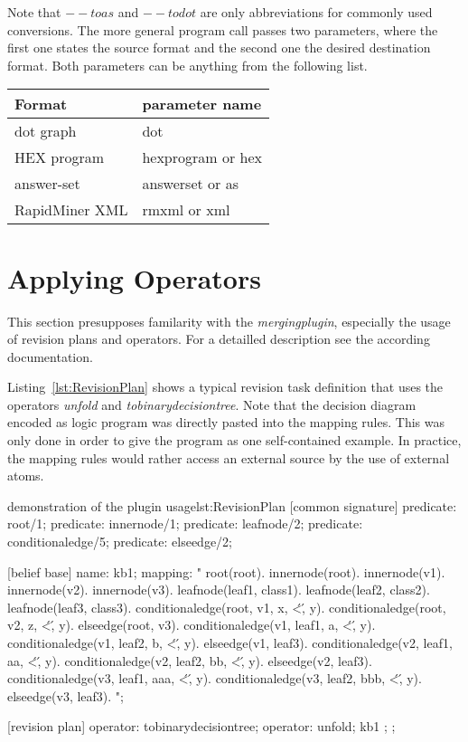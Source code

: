 \documentclass[a4paper,11pt]{article}
\theoremstyle{definition}
\newcommand{\hex}{\textsf{HEX}\xspace }
\newcommand{\dotff}{\textsf{dot}\xspace }
\newcommand{\inlinecode}[1]{\textsf{#1}\xspace }
\begin{document}
			Note that $--toas$ and $--todot$ are only abbreviations for commonly used conversions. The more general program call passes two parameters, where the first one
			states the source format and the second one the desired destination format. Both parameters can be anything from the following list.
			\begin{tabularx}{\textwidth}{|X|X|}
				\hline
				Format		& parameter name \\
				\hline
				\dotff graph & \inlinecode{dot} \\
				\hex program & \inlinecode{hexprogram} or \inlinecode{hex} \\
				answer-set & \inlinecode{answerset} or \inlinecode{as} \\
				RapidMiner XML & \inlinecode{rmxml} or \inlinecode{xml} \\
				\hline
			\end{tabularx}
			

	\section{Applying Operators}
	\label{sec:Operators}
	
		This section presupposes familarity with the \textit{mergingplugin}, especially the usage of revision plans and operators. For a detailled description see the according
		documentation.
		
		Listing~\ref{lst:RevisionPlan} shows a typical revision task definition that uses the operators \emph{unfold} and \emph{tobinarydecisiontree}. Note that the decision diagram
		encoded as logic program was directly pasted into the mapping rules. This was only done in order to give the program as one self-contained example. In practice, the mapping
		rules would rather access an external source by the use of external atoms.
		
		\begin{program}[dlvhex]{demonstration of the plugin usage}{lst:RevisionPlan}
[common signature]
predicate: root/1;
predicate: innernode/1;
predicate: leafnode/2;
predicate: conditionaledge/5;
predicate: elseedge/2;

[belief base]
name: kb1;
mapping: "
	root(root).
	innernode(root).
	innernode(v1).
	innernode(v2).
	innernode(v3).
	leafnode(leaf1, class1).
	leafnode(leaf2, class2).
	leafnode(leaf3, class3).
	conditionaledge(root, v1, x, \'<\', y).
	conditionaledge(root, v2, z, \'<\', y).
	elseedge(root, v3).
	conditionaledge(v1, leaf1, a, \'<\', y).
	conditionaledge(v1, leaf2, b, \'<\', y).
	elseedge(v1, leaf3).
	conditionaledge(v2, leaf1, aa, \'<\', y).
	conditionaledge(v2, leaf2, bb, \'<\', y).
	elseedge(v2, leaf3).
	conditionaledge(v3, leaf1, aaa, \'<\', y).
	conditionaledge(v3, leaf2, bbb, \'<\', y).
	elseedge(v3, leaf3).
";

[revision plan]
{
	operator: tobinarydecisiontree;
	{
		operator: unfold;
		{
			kb1
		};
	};
}
		\end{program}
		
\end{document}
